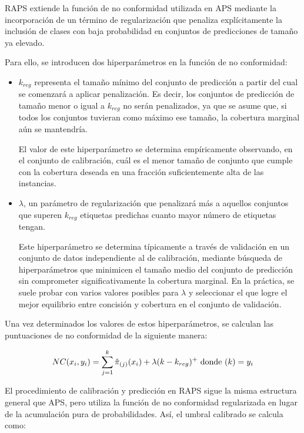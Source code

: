 \acrshort{RAPS} extiende la función de no conformidad utilizada en \acrshort{APS} mediante la incorporación de un término de regularización que penaliza explícitamente la inclusión de clases con baja probabilidad en conjuntos de predicciones de tamaño ya elevado. 

Para ello, se introducen dos hiperparámetros en la función de no conformidad:

\begin{itemize}

    \item $k_{reg}$ representa el tamaño mínimo del conjunto de predicción a partir del cual se comenzará a aplicar penalización. Es decir, los conjuntos de predicción de tamaño menor o igual a $k_{reg}$ no serán penalizados, ya que se asume que, si todos los conjuntos tuvieran como máximo ese tamaño, la cobertura marginal aún se mantendría. 
    
    El valor de este hiperparámetro se determina empíricamente observando, en el conjunto de calibración, cuál es el menor tamaño de conjunto que cumple con la cobertura deseada en una fracción suficientemente alta de las instancias. 
   
    \item $\lambda$, un parámetro de regularización que penalizará más a aquellos conjuntos que superen $k_{reg}$ etiquetas predichas cuanto mayor número de etiquetas tengan. 

    Este hiperparámetro se determina típicamente a través de validación en un conjunto de datos independiente al de calibración, mediante búsqueda de hiperparámetros que minimicen el tamaño medio del conjunto de predicción sin comprometer significativamente la cobertura marginal. En la práctica, se suele probar con varios valores posibles para $\lambda$ y seleccionar el que logre el mejor equilibrio entre concisión y cobertura en el conjunto de validación.

\end{itemize}

Una vez determinados los valores de estos hiperparámetros, se calculan las puntuaciones de no conformidad de la siguiente manera:

$$
NC(x_i, y_i) = \sum_{j=1}^k \hat{\pi}_{(j)}(x_i) + \lambda (k-k_{reg})^+ \textnormal{ donde } (k) = y_i
$$

El procedimiento de calibración y predicción en \acrshort{RAPS} sigue la misma estructura general que \acrshort{APS}, pero utiliza la función de no conformidad regularizada en lugar de la acumulación pura de probabilidades. Así, el umbral calibrado se calcula como:

